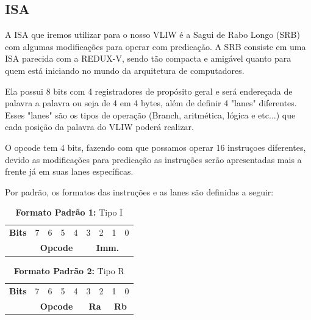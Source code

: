 \documentclass{article}
\begin{document}
    \subsection{ISA}

    A ISA que iremos utilizar para o nosso VLIW é a Sagui de Rabo Longo (SRB) com algumas modificações para operar com predicação.
    A SRB consiste em uma ISA parecida com a REDUX-V, sendo tão compacta e amigável quanto para quem está iniciando no mundo da arquitetura de computadores. 
    
    Ela possui 8 bits com 4 registradores de propósito geral e será endereçada de palavra a palavra ou seja de 4 em 4 bytes, além de definir 4 "lanes" diferentes. Esses "lanes" são os tipos de operação (Branch, aritmética, lógica e etc...) que cada posição da palavra do VLIW poderá realizar.
    
    O opcode tem 4 bits, fazendo com que possamos operar 16 instruçoes diferentes, devido as modificações para predicação as instruções serão apresentadas mais a frente já em suas lanes específicas.
    
    Por padrão, os formatos das instruções e as lanes são definidas a seguir:

    \begin{table}[h]
      \captionsetup{labelformat=empty, skip=0pt}
      \caption{\textbf{Formato Padrão 1:} Tipo I}
      \centering
      \begin{tabular}{|c|*{8}{c|}}
        \hline
        \rowcolor{green!50}
        \multicolumn{9}{|c|}{\textbf{Tipo I}} \\ \hline
        \textbf{Bits} & 7 & 6 & 5 & 4 & 3 & 2 & 1 & 0 \\ \hline
        & \multicolumn{4}{c|}{\textbf{Opcode}} & \multicolumn{4}{c|}{\textbf{Imm.}} \\ \hline
      \end{tabular}
    \end{table}

    \begin{table}[h]
      \captionsetup{labelformat=empty, skip=0pt}
      \caption{\textbf{Formato Padrão 2:} Tipo R}
      \centering
      \begin{tabular}{|c|*{8}{c|}}
        \hline
        \rowcolor{blue!50}
        \multicolumn{9}{|c|}{\textbf{Tipo R}} \\ \hline
        \textbf{Bits} & 7 & 6 & 5 & 4 & 3 & 2 & 1 & 0 \\ \hline
        & \multicolumn{4}{c|}{\textbf{Opcode}} & \multicolumn{2}{c|}{\textbf{Ra}} & \multicolumn{2}{c|}{\textbf{Rb}} \\ \hline
      \end{tabular}
    \end{table}
\end{document}
